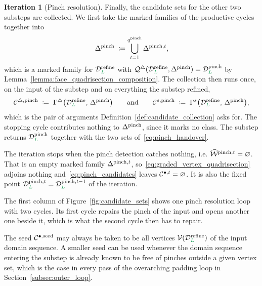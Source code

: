 \documentclass[a4paper, 12pt]{article}
\makeatletter
\newcommand{\quadriF}{\mathcal{Q}^{\triangle}}                   %
\newcommand{\collectF}{\Gamma^{\triangle}}                       %
\newcommand{\collectC}{\Gamma^{s}}                               %
\DeclareRobustCommand{\candV}[1][]{\mathcal{C}^{\bullet\ifx\@empty#1\@empty\else,#1\fi}}
\DeclareRobustCommand{\candF}[1][]{\mathcal{C}^{\triangle\ifx\@empty#1\@empty\else,#1\fi}}
\DeclareRobustCommand{\candC}[1][]{\mathcal{C}^{s\ifx\@empty#1\@empty\else,#1\fi}}
\newcommand{\green}{\color{ForestGreen}}
\newcommand{\V}{\mathcal{V}}
\DeclareRobustCommand{\simplexsubsetTwo}[2][]{\Delta\ifx\@empty#1\@empty\else^{#1}\fi_{#2}}
\DeclareRobustCommand{\markedVertexClasses}[1][]{\widehat{\mathcal{W}}\ifx\@empty#1\@empty\else^{#1}\fi}
\renewcommand{\L}{{\green L}}
\theoremstyle{definition}
\newtheorem{iteration}[theorem]{Iteration}
\theoremstyle{plain}
\numberwithin{equation}{section}
\newcommand{\tobecut}[1]{{\color{red} #1}}     %
\DeclareRobustCommand{\domseq}[1][]{\mathcal{D}\ifx\@empty#1\@empty\else_{#1}\fi}
\makeatother
\begin{document}
\begin{iteration}[Pinch resolution]
Finally, the candidate sets for the other two substeps are collected. We first take the marked families of the productive cycles together into
\begin{equation}
    \label{eq:pinch_total_family}
    \simplexsubsetTwo[\mathrm{pinch}]{} \; \coloneq \bigcup\limits_{t = 1}^{q^{\mathrm{pinch}}} \simplexsubsetTwo[\mathrm{pinch},t]{} ,
\end{equation}
which is a marked family for $\domseq[\L]^{\mathrm{refine}}$ with $\quadriF ( \domseq[\L]^{\mathrm{refine}}, \simplexsubsetTwo[\mathrm{pinch}]{} ) = \domseq[\L]^{\mathrm{pinch}}$ by Lemma~\ref{lemma:face_quadrisection_composition}. The collection then runs once, on the input of the substep and on everything the substep refined,
\begin{equation}
    \label{eq:pinch_handover}
    \candF[\mathrm{pinch}] \; \coloneq \; \collectF \big( \domseq[\L]^{\mathrm{refine}}, \, \simplexsubsetTwo[\mathrm{pinch}]{} \big)
    \qquad \text{and} \qquad
    \candC[\mathrm{pinch}] \; \coloneq \; \collectC \big( \domseq[\L]^{\mathrm{refine}}, \, \simplexsubsetTwo[\mathrm{pinch}]{} \big) ,
\end{equation}
which is the pair of arguments Definition~\ref{def:candidate_collection} asks for. The stopping cycle contributes nothing to $\simplexsubsetTwo[\mathrm{pinch}]{}$, since it marks no class. The substep returns $\domseq[\L]^{\mathrm{pinch}}$ together with the two sets of~\eqref{eq:pinch_handover}.
\end{iteration}

The iteration stops when the pinch detection catches nothing, i.e. $\markedVertexClasses[\mathrm{pinch},t] = \varnothing$. That is an empty marked family $\simplexsubsetTwo[\mathrm{pinch},t]{}$, so~\eqref{eq:graded_vertex_quadrisection} adjoins nothing and~\eqref{eq:pinch_candidates} leaves $\candV[t] = \varnothing$. It is also the fixed point $\domseq[\L]^{\mathrm{pinch},t} = \domseq[\L]^{\mathrm{pinch},t-1}$ of the iteration.

The first column of Figure~\ref{fig:candidate_sets} shows one pinch resolution loop with two cycles. Its first cycle repairs the pinch of the input and opens another one beside it, which is what the second cycle then has to repair.

\tobecut{The seed $\candV[\mathrm{seed}]$ may always be taken to be all vertices $\V(\domseq[\L]^{\mathrm{refine}})$ of the input domain sequence. A smaller seed can be used whenever the domain sequence entering the substep is already known to be free of pinches outside a given vertex set, which is the case in every pass of the overarching padding loop in Section~\ref{subsec:outer_loop}.}
\end{document}
